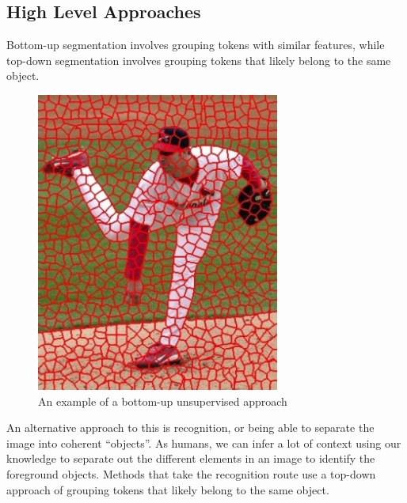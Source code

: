 \documentclass{math}
\begin{document}
\subsection*{High Level Approaches}
Bottom-up segmentation involves grouping tokens with similar features, while
top-down segmentation involves grouping tokens that likely belong to the same
object.
\begin{figure}[H]
    \centering
    \includegraphics[width=8cm]{assets/segmentation_example1.png}
    \caption{An example of a bottom-up unsupervised approach}
\end{figure}
An alternative approach to this is recognition, or being able to separate the
image into coherent ``objects''. As humans, we can infer a lot of context using
our knowledge to separate out the different elements in an image to identify the
foreground objects. Methods that take the recognition route use a top-down
approach of grouping tokens that likely belong to the same object.
\end{document}
